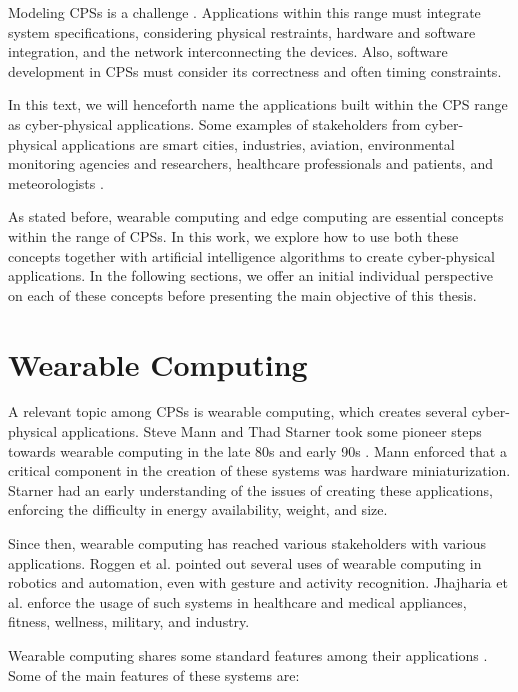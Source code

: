 Modeling CPSs is a challenge \cite{derler2011modeling}. Applications within this range must integrate system specifications, considering physical restraints, hardware and software integration, and the network interconnecting the devices. Also, software development in CPSs must consider its correctness and often timing constraints.

In this text, we will henceforth name the applications built within the CPS range as cyber-physical applications. Some examples of stakeholders from cyber-physical applications are smart cities, industries, aviation, environmental monitoring agencies and researchers, healthcare professionals and patients, and meteorologists \cite{alguliyev2018cyber, baheti2011cyber, zanero2017cyber, haque2014review}.

As stated before, wearable computing and edge computing are essential concepts within the range of CPSs. In this work, we explore how to use both these concepts together with artificial intelligence algorithms to create cyber-physical applications. In the following sections, we offer an initial individual perspective on each of these concepts before presenting the main objective of this thesis.

\section{Wearable Computing}

A relevant topic among CPSs is wearable computing, which creates several cyber-physical applications. Steve Mann and Thad Starner took some pioneer steps towards wearable computing in the late 80s and early 90s \cite{mann1997wearable, starner1996human}. Mann \cite{mann1997wearable} enforced that a critical component in the creation of these systems was hardware miniaturization. Starner \cite{starner1996human} had an early understanding of the issues of creating these applications, enforcing the difficulty in energy availability, weight, and size.

Since then, wearable computing has reached various stakeholders with various applications. Roggen et al. \cite{roggen2011wearable} pointed out several uses of wearable computing in robotics and automation, even with gesture and activity recognition. Jhajharia et al. \cite{jhajharia2014wearable} enforce the usage of such systems in healthcare and medical appliances, fitness, wellness, military, and industry.

Wearable computing shares some standard features among their applications \cite{jhajharia2014wearable}. Some of the main features of these systems are:

